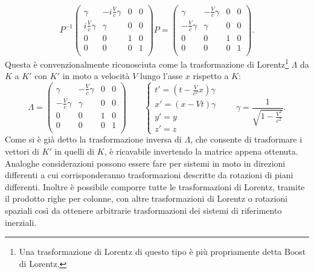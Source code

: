 \begin{equation*}
    P^{-1}\begin{pmatrix}
        \gamma & -i\frac{V}{c}\gamma & 0 & 0\\
        i\frac{V}{c}\gamma & \gamma & 0 & 0\\
        0& 0 & 1 & 0\\
        0& 0 & 0 & 1\\
       \end{pmatrix}
       P=\begin{pmatrix}
        \gamma & -\frac{V}{c}\gamma & 0 & 0\\
        -\frac{V}{c}\gamma & \gamma & 0 & 0\\
        0& 0 & 1 & 0\\
        0& 0 & 0 & 1\\
       \end{pmatrix}.
 \end{equation*}
 Questa è convenzionalmente riconosciuta come la trasformazione di Lorentz\footnote{Una trasformazione di Lorentz di questo tipo è più propriamente detta Boost di Lorentz.} $\Lambda$ da $K$ a $K'$ con $K'$ in moto a velocità $V$ lungo l'asse $x$ rispetto a $K$:
 \begin{equation}
    \Lambda=
    \begin{pmatrix}
        \gamma & -\frac{V}{c}\gamma & 0 & 0\\
        -\frac{V}{c}\gamma & \gamma & 0 & 0\\
        0& 0 & 1 & 0\\
        0& 0 & 0 & 1\\
       \end{pmatrix}
       \qquad
       \begin{cases}
        t'=(t-\frac{V}{c^2}x)\gamma\\
        x'=(x-Vt)\gamma\\
        y'=y\\
        z'=z
       \end{cases}
       \qquad \gamma=\frac{1}{\sqrt{1-\frac{V^2}{c^2}}}.
       \label{TrasformazioneLorentz}
 \end{equation}
Come si è già detto la trasformazione inversa di $\Lambda$, che consente di trasformare i vettori di $K'$ in quelli di $K$, è ricavabile invertendo la matrice appena ottenuta.\\

Analoghe considerazioni possono essere fare per sistemi in moto in direzioni differenti a cui corrisponderanno trasformazioni descritte da rotazioni di piani differenti. Inoltre è possibile comporre tutte le trasformazioni di Lorentz, tramite il prodotto righe per colonne, con altre trasformazioni di Lorentz o rotazioni spaziali così da ottenere arbitrarie trasformazioni dei sistemi di riferimento inerziali.\\

